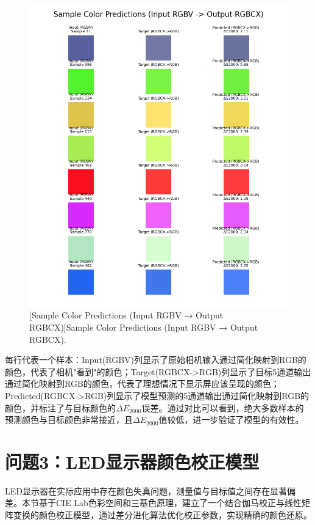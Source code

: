 \begin{figure}[H]
\centering
{}
\includegraphics[width=0.8\columnwidth]{figures/Sample.png}
[Sample Color Predictions (Input RGBV → Output RGBCX)]{Sample Color Predictions (Input RGBV → Output RGBCX).}
\label{figure2: sample_predictions}
\end{figure}

每行代表一个样本：Input(RGBV)列显示了原始相机输入通过简化映射到RGB的颜色，代表了相机"看到"的颜色；Target(RGBCX->RGB)列显示了目标5通道输出通过简化映射到RGB的颜色，代表了理想情况下显示屏应该呈现的颜色；Predicted(RGBCX->RGB)列显示了模型预测的5通道输出通过简化映射到RGB的颜色，并标注了与目标颜色的$\Delta E_{2000}$误差。通过对比可以看到，绝大多数样本的预测颜色与目标颜色非常接近，且$\Delta E_{2000}$值较低，进一步验证了模型的有效性。

\section[\hspace{-2pt}问题3：LED显示器颜色校正模型]{{\heiti{} \hspace{-8pt}问题3：LED显示器颜色校正模型}}\label{section4: 问题3：LED显示器颜色校正模型}

LED显示器在实际应用中存在颜色失真问题，测量值与目标值之间存在显著偏差。本节基于CIE Lab色彩空间和三基色原理，建立了一个结合伽马校正与线性矩阵变换的颜色校正模型，通过差分进化算法优化校正参数，实现精确的颜色还原。

